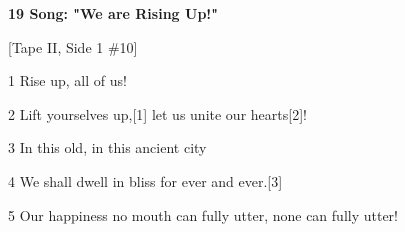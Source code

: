 
\textbf{19 Song: "We are Rising Up!"}

[Tape II, Side 1 \#10]

1 Rise up, all of us!

2 Lift yourselves up,[1] let us unite our hearts[2]!

3 In this old, in this ancient city

4 We shall dwell in bliss for ever and ever.[3]

5 Our happiness no mouth can fully utter, none can fully utter!

